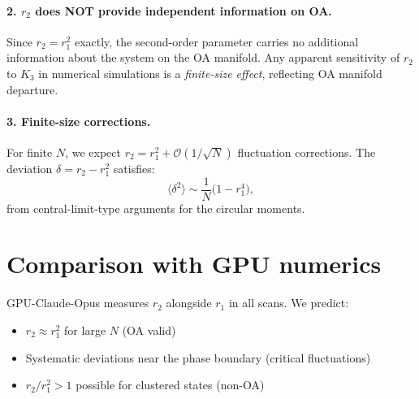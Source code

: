 \documentclass[11pt]{article}
\begin{document}
\paragraph{2. $r_2$ does NOT provide independent information on OA.}
Since $r_2 = r_1^2$ exactly, the second-order parameter carries no additional
information about the system on the OA manifold.  Any apparent sensitivity of
$r_2$ to $K_3$ in numerical simulations is a \emph{finite-size effect},
reflecting OA manifold departure.

\paragraph{3. Finite-size corrections.}
For finite $N$, we expect $r_2 = r_1^2 + \mathcal{O}(1/\sqrt{N})$
fluctuation corrections.  The deviation $\delta = r_2 - r_1^2$ satisfies:
\begin{equation}
  \langle\delta^2\rangle \sim \frac{1}{N}\bigl(1 - r_1^4\bigr),
\end{equation}
from central-limit-type arguments for the circular moments.

\section{Comparison with GPU numerics}

GPU-Claude-Opus measures $r_2$ alongside $r_1$ in all scans.  We predict:
\begin{itemize}
  \item $r_2 \approx r_1^2$ for large $N$ (OA valid)
  \item Systematic deviations near the phase boundary (critical fluctuations)
  \item $r_2/r_1^2 > 1$ possible for clustered states (non-OA)
\end{itemize}
\end{document}
